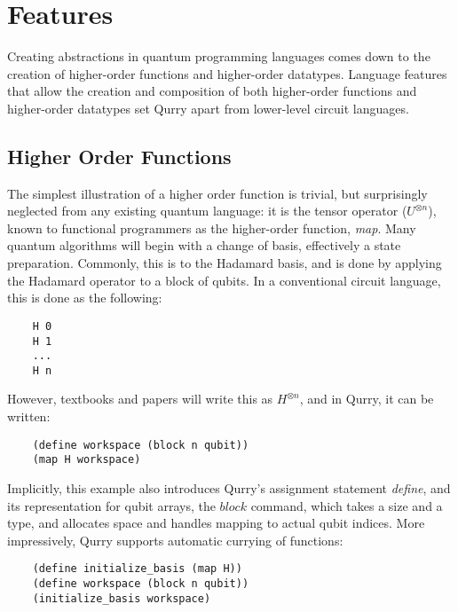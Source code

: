 \documentclass[a4paper,twocolumn,11pt,accepted=2017-05-09]{quantumarticle}
\begin{document}
\section{Features}

    Creating abstractions in quantum programming languages comes down to the creation of higher-order functions and higher-order datatypes.
    Language features that allow the creation and composition of both higher-order functions and higher-order datatypes set Qurry apart from lower-level circuit languages.

    \subsection{Higher Order Functions}

    The simplest illustration of a higher order function is trivial, but surprisingly neglected from any existing quantum language: it is the tensor operator ($U^{\otimes n}$), known to functional programmers as the higher-order function, \emph{map}.
    Many quantum algorithms will begin with a change of basis, effectively a state preparation. 
    Commonly, this is to the Hadamard basis, and is done by applying the Hadamard operator to a block of qubits.
    In a conventional circuit language, this is done as the following:
    \begin{verbatim}
    H 0
    H 1
    ...
    H n\end{verbatim}
    However, textbooks and papers will write this as $H^{\otimes n}$, and in Qurry, it can be written:
    \begin{verbatim}
    (define workspace (block n qubit))
    (map H workspace)\end{verbatim}
    Implicitly, this example also introduces Qurry's assignment statement \emph{define}, and its representation for qubit arrays, the $block$ command, which takes a size and a type, and allocates space and handles mapping to actual qubit indices.
    More impressively, Qurry supports automatic currying of functions:
    \begin{verbatim}
    (define initialize_basis (map H))
    (define workspace (block n qubit))
    (initialize_basis workspace)\end{verbatim}
\end{document}
